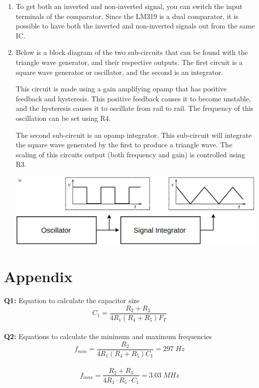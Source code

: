 \documentclass[a4paper,11pt]{article}
\begin{document}
\begin{preview}
\begin{enumerate}
    
    \item To get both an inverted and non-inverted signal, you can switch the input terminals of the comparator. Since the LM319 is a dual comparator, it is possible to have both the inverted and non-inverted signals out from the same IC. \\
    

    \item 

    Below is a block diagram of the two sub-circuits that can be found with the triangle wave generator, and their respective outputs. The first circuit is a square wave generator or oscillator, and the second is an integrator. 
    
    This circuit is made using a gain amplifying opamp that has positive feedback and hysteresis. This positive feedback causes it to become unstable, and the hysteresis causes it to oscillate from rail to rail. The frequency of this oscillation can be set using R4. 

    The second sub-circuit is an opamp integrator. This sub-circuit will integrate the square wave generated by the first to produce a triangle wave. The scaling of this circuits output (both frequency and gain) is controlled using R3. 
    
    \begin{center}
        \includegraphics[width = 1\textwidth]{block_diagram.png}
    \end{center}
    \vspace{10pt}


\end{enumerate}

\section*{Appendix}

\textbf{Q1:} Equation to calculate the capacitor size
$$ C_{1}=\frac{R_{2}+R_{3}}{4R_{1}\left(R_{4}+R_{5}\right)F_{T}} $$\\

\textbf{Q2:} Equations to calculate the minimum and maximum frequencies
$$ f_{min}=\frac{R_{2}}{4R_{1}\left(R_{4}+R_{5}\right)C_{1}} = 297\;Hz $$ \\
$$ f_{max}=\frac{R_{2}+R_{3}}{4R_{1}\cdot R_{5}\cdot C_{1}} = 3.03\;MHz $$\\


\end{preview}
\end{document}
